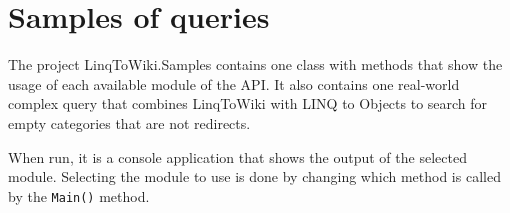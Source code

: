 \section{Samples of queries}
\label{ltw-s}

The project LinqToWiki.Samples contains one class with methods
that show the usage of each available module of the \ac{API}.
It also contains one real-world complex query that combines LinqToWiki with LINQ to Objects
to search for empty categories that are not redirects.

When run, it is a console application that shows the output of the selected module.
Selecting the module to use is done by changing which method is called by the \lstinline{Main()} method.